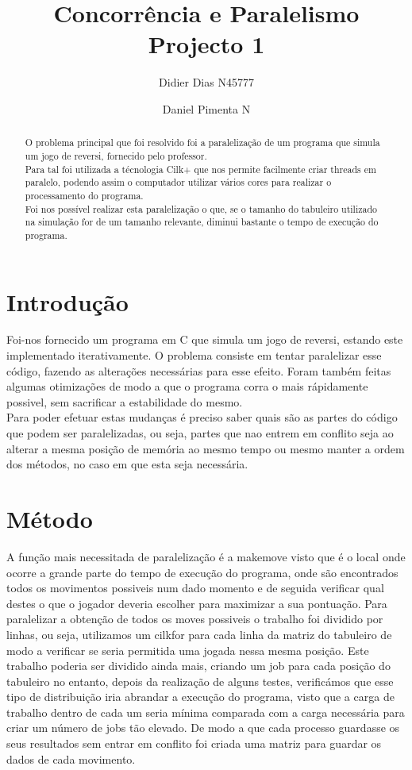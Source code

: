 \documentclass[a4paper]{article}
\title{Concorrência e Paralelismo \\
\large Projecto 1}
\author{Didier Dias N45777\and Daniel Pimenta N}
\begin{document}
\maketitle

\begin{abstract}
O problema principal que foi resolvido foi a paralelização de um programa que simula um jogo de reversi, fornecido pelo professor. \\
Para tal foi utilizada a técnologia Cilk+ que nos permite facilmente criar threads em paralelo, podendo assim o computador utilizar vários cores para realizar o processamento do programa.\\
Foi nos possível realizar esta paralelização o que, se o  tamanho do tabuleiro utilizado na simulação for de um tamanho relevante, diminui bastante o tempo de execução do programa.
\end{abstract}

\section{Introdução}


Foi-nos fornecido um programa em C que simula um jogo de reversi, estando este implementado iterativamente. O problema consiste em tentar paralelizar esse código, fazendo as alterações necessárias para esse efeito. Foram também feitas algumas otimizações de modo a que o programa corra o mais rápidamente possivel, sem sacrificar a estabilidade do mesmo.\\
Para poder efetuar estas mudanças é preciso saber quais são as partes do código que podem ser paralelizadas, ou seja, partes que nao entrem em conflito seja ao alterar a mesma posição de memória ao mesmo tempo ou mesmo manter a ordem dos métodos, no caso em que esta seja necessária.

\section{Método}
A função mais necessitada de paralelização é a make\textunderscore move visto que é o local onde ocorre a grande parte do tempo de execução do programa, onde são encontrados todos os movimentos possiveis num dado momento e de seguida verificar qual destes o que o jogador deveria escolher para maximizar a sua pontuação. Para paralelizar a obtenção de todos os moves possiveis o trabalho foi dividido por linhas, ou seja, utilizamos um cilk\textunderscore for para cada linha da matriz do tabuleiro de modo a verificar se seria permitida uma jogada nessa mesma posição. Este trabalho poderia ser dividido ainda mais, criando um job para cada posição do tabuleiro no entanto, depois da realização de alguns testes, verificámos que esse tipo de distribuição iria abrandar a execução do programa, visto que a carga de trabalho dentro de cada um seria mínima comparada com a carga necessária para criar um número de jobs tão elevado.
De modo a que cada processo guardasse os seus resultados sem entrar em conflito foi criada uma matriz para guardar os dados de cada movimento.
\end{document}
